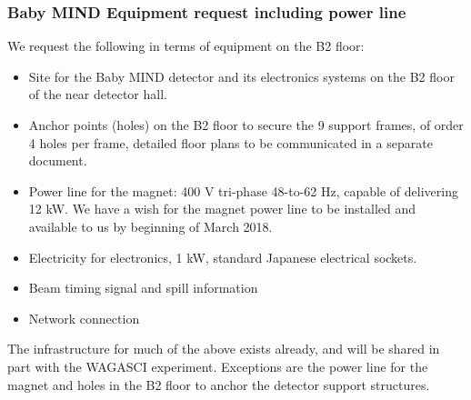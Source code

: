 \subsubsection{Baby MIND Equipment request including power line}
We request the following in terms of equipment on the B2 floor:
\begin{itemize}
\item{Site for the Baby MIND detector and its electronics systems on the B2 floor of the near detector hall.}
\item{Anchor points (holes) on the B2 floor to secure the 9 support frames, of order 4 holes per frame, detailed floor plans to be communicated in a separate document.}
\item{Power line for the magnet: 400 V tri-phase 48-to-62 Hz, capable of delivering 12 kW. We have a wish for the magnet power line to be installed and available to us by beginning of March 2018.}
\item{Electricity for electronics, 1 kW, standard Japanese electrical sockets.}
\item{Beam timing signal and spill information}
\item{Network connection}
\end{itemize}
The infrastructure for much of the above exists already, and will be shared in part with the WAGASCI experiment. Exceptions are the power line for the magnet and holes in the B2 floor to anchor the detector support structures.
